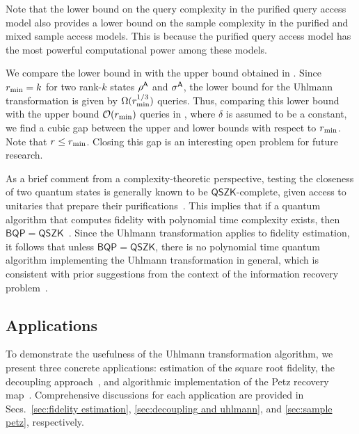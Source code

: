 Note that the lower bound on the query complexity in the purified query access model also provides a lower bound on the sample complexity in the purified and mixed sample access models. 
This is because the purified query access model has the most powerful computational power among these models.


We compare the lower bound in  with the upper bound obtained in .
Since $r_{\rm min} = k$ for two rank-$k$ states $\rho^{\mathsf{A}}$ and $\sigma^{\mathsf{A}}$, the lower bound for the Uhlmann transformation is given by $\Omega(r_{\rm min}^{1/3})$ queries.
Thus, comparing this lower bound with the upper bound ${\mathcal{O}}(r_{\rm min})$ queries in , where $\delta$ is assumed to be a constant, we find a cubic gap between the upper and lower bounds with respect to $r_{\rm min}$.
Note that $r \leq r_{\rm min}$.
Closing this gap is an interesting open problem for future research.


As a brief comment from a complexity-theoretic perspective, testing the closeness of two quantum states is generally known to be $\mathsf{QSZK}$-complete, given access to unitaries that prepare their purifications~\cite{watrous2002limitQSZK, watrous2009QSZKquantumattacks}.
This implies that if a quantum algorithm that computes fidelity with polynomial time complexity exists, then $\mathsf{BQP} = \mathsf{QSZK}$~\cite{Rethinasamy2023estimatingdist}.
Since the Uhlmann transformation applies to fidelity estimation, it follows that unless $\mathsf{BQP} = \mathsf{QSZK}$, there is no polynomial time quantum algorithm implementing the Uhlmann transformation in general, which is consistent with prior suggestions from the context of the information recovery problem~\cite{harlow2013CompvsFirewall, aaronson2016moneyblackhole, brakerski2023blackholeradiation}.









\subsection{Applications}
\label{sec:overview application}


To demonstrate the usefulness of the Uhlmann transformation algorithm, we present three concrete applications: estimation of the square root fidelity, the decoupling approach~\cite{hayden2008decoupling, dupuis2010decoupling, Szehr2013decouple2design, dupuis2014one, preskill2016quantumshannon}, and algorithmic implementation of the Petz recovery map~\cite{petz1986sufficient, petz1988sufficiency}.
Comprehensive discussions for each application are provided in Secs.~\ref{sec:fidelity estimation}, \ref{sec:decoupling and uhlmann}, and \ref{sec:sample petz}, respectively.






